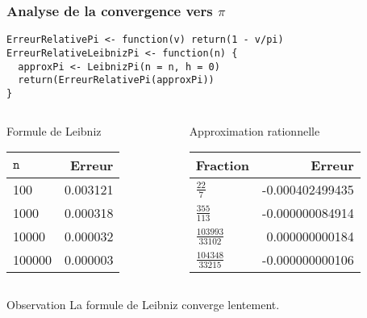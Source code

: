 \documentclass[10pt]{beamer}
\begin{document}
\begin{frame}[fragile]
  \frametitle{Analyse de la convergence vers $\pi$}
  \begin{lstlisting}[style=editor]
ErreurRelativePi <- function(v) return(1 - v/pi)
ErreurRelativeLeibnizPi <- function(n) {
  approxPi <- LeibnizPi(n = n, h = 0)
  return(ErreurRelativePi(approxPi))
}
\end{lstlisting}



\begin{columns}[t]
\begin{column}{0.48\textwidth}
  \begin{exampleblock}{Formule de Leibniz}
    \begin{tabular}{lr}
      \toprule
    $\mathtt{n}$ & Erreur   \\
    \midrule
    100          & 0.003121 \\
    1000         & 0.000318 \\
    10000        & 0.000032 \\
    100000       & 0.000003 \\
      \bottomrule
  \end{tabular}

  \end{exampleblock}

\end{column}
\begin{column}{0.48\textwidth}
  \begin{exampleblock}{Approximation rationnelle}
    \begin{tabular}{lr}
    \toprule
    Fraction               & Erreur          \\
    \midrule
    $\frac{22}{7}$         & -0.000402499435 \\
    $\frac{355}{113}$      & -0.000000084914 \\
    $\frac{103993}{33102}$ & 0.000000000184  \\
    $\frac{104348}{33215}$ & -0.000000000106 \\
    \bottomrule
  \end{tabular}
  \end{exampleblock}
\end{column}
\end{columns}



\begin{alertblock}{Observation}
  \alert{La formule de Leibniz converge lentement.}
\end{alertblock}

\end{frame}
\end{document}
